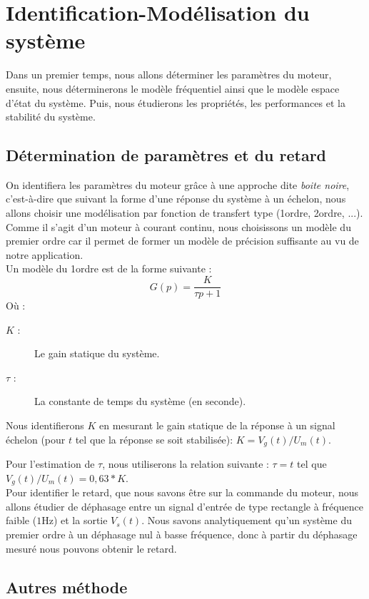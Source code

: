 \chapter{Identification-Modélisation du système}
Dans un premier temps, nous allons déterminer les paramètres du moteur, ensuite, nous déterminerons le modèle fréquentiel ainsi que le modèle espace d'état du système. Puis, nous étudierons les propriétés, les performances et la stabilité du système. 
	\section{Détermination de paramètres et du retard}
	On identifiera les paramètres du moteur grâce à une approche dite \emph{boite noire}, c'est-à-dire que suivant la forme d'une réponse du système à un échelon, nous allons choisir une modélisation par fonction de transfert type (1\ier ordre, 2\ieme ordre, ...). Comme il s'agit d'un moteur à courant continu, nous choisissons un modèle du premier ordre car il permet de former un modèle de précision suffisante au vu de notre application.\\
Un modèle du 1\ier ordre est de la forme suivante :
\begin{equation}
G(p) = \frac{K}{\tau p+1}
\end{equation}
Où : 
\begin{description}
\item[$K$ :] Le gain statique du système.
\item[$\tau$ :] La constante de temps du système (en seconde).
\end{description}
Nous identifierons $K$ en mesurant le gain statique  de la réponse à un signal échelon (pour $t$ tel que la réponse se soit stabilisée): $ K = V_g(t)/U_m(t)$.


Pour l'estimation de $\tau$, nous utiliserons la relation suivante : $ \tau = t$ tel que $V_g(t)/U_m(t) = 0,63*K $.\\

Pour identifier le retard, que nous savons être sur la commande du moteur, nous allons étudier de déphasage entre un signal d'entrée de type rectangle à fréquence faible ($1$Hz) et la sortie $V_s(t)$. Nous savons analytiquement qu'un système du premier ordre à un déphasage nul à basse fréquence, donc à partir du déphasage mesuré nous pouvons obtenir le retard.

	\section{Autres méthode}
